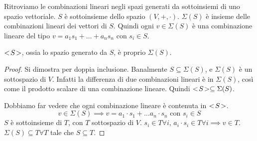 Ritroviamo le combinazioni lineari negli spazi generati da sottoinsiemi di uno spazio vettoriale. $S$ \`e sottoinsieme dello spazio $(V, +, \cdot)$. $\Sigma (S)$ \`e insieme delle combinazioni lineari dei vettori di $S$. Quindi ogni $v \in \Sigma(S)$ \`e una combinazione lineare del tipo $v = a_1 s_1 + \dots + a_n s_n$ con $s_i \in S$.

\begin{prop}
$<\!{S}\!>$, ossia lo spazio generato da $S$, \`e proprio $\Sigma(S)$.
\end{prop}
\begin{proof}
Si dimostra per doppia inclusione. Banalmente $S \subseteq \Sigma(S)$, e $\Sigma(S)$ \`e un sottospazio di $V$. Infatti la differenza di due combinazioni lineari \`e in $\Sigma (S)$, cos\`i come il prodotto scalare di una combinazione lineare. Quindi $<\!{S}\!> \subseteq \Sigma (S)$.

Dobbiamo far vedere che ogni combinazione lineare \`e contenuta in $<\!{S}\!>$.
\[
v \in \Sigma(S) \implies v = a_1 \cdot s_1 + \dots a_n \cdot s_n \text{ con } s_i \in S
\]
$S$ \`e sottoinsieme di $T$, con $T$ sottospazio di $V$. $s_i \in T \forall i$, $a_i \cdot s_i \in T \forall i \implies v \in T$. $\Sigma(S) \subseteq T \forall T$ tale che $S \subseteq T$.
\end{proof}

